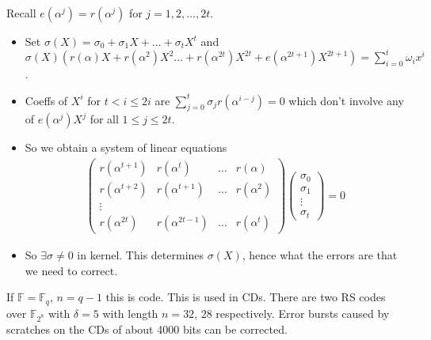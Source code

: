 Recall $e(\alpha^j) = r(\alpha^j)$ for $j = 1, 2, \dots, 2t$.
\begin{itemize}
    \item Set $\sigma(X) = \sigma_0 + \sigma_1 X + \dots + \sigma_t X^t$ and $\sigma(X)(r(\alpha) X + r(\alpha^2) X^2 \dots + r(\alpha^{2t})X^{2t} + e(\alpha^{2t + 1}) X^{2t + 1}) = \sum_{i=0}^{t} \omega_i x^i$.
    \item Coeffs of $X^i$ for $t < i \leq 2i$ are $\sum_{j=0}^t \sigma_j r(\alpha^{i-j}) = 0$ which don't involve any of $e(\alpha^j)X^j$ for all $1 \leq j \leq 2t$.
    \item So we obtain a system of linear equations
    \begin{align*}
        \begin{pmatrix}
        r(\alpha^{t+1}) & r(\alpha^t) & \dots & r(\alpha) \\
        r(\alpha^{t+2}) & r(\alpha^{t+1}) & \dots & r(\alpha^2) \\
        \vdots &  &  &  \\
        r(\alpha^{2t}) & r(\alpha^{2t-1}) & \dots & r(\alpha^{t})
        \end{pmatrix}
        \begin{pmatrix}\sigma_0 \\ \sigma_1 \\ \vdots\\ \sigma_t \end{pmatrix}
        = 0
    \end{align*}
    \item So $\exists \sigma \neq 0$ in kernel.
    This determines $\sigma(X)$, hence what the errors are that we need to correct.
\end{itemize}

\begin{example}
    If $\mathbb{F} = \mathbb{F}_q$, $n = q - 1$ this is  code.
    This is used in CDs.
    There are two RS codes over $\mathbb{F}_{2^8}$ with $\delta = 5$ with length $n = 32$, $28$ respectively.
    Error bursts caused by scratches on the CDs of about 4000 bits can be corrected.
\end{example}

